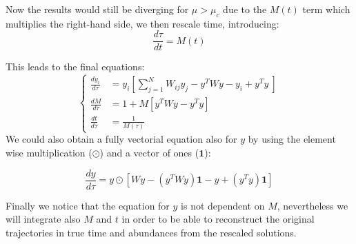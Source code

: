 Now the results would still be diverging for $\mu > \mu_c$ due to the $M(t)$ term which multiplies the right-hand side, we then rescale time, introducing:
\begin{equation}
    \frac{d\tau}{dt} = M(t)
\end{equation}

This leads to the final equations:
\begin{equation}
    \left\{
        \begin{aligned}
           \frac{dy_i}{d\tau} &= y_i \left[ \sum_{j=1}^N W_{ij} y_j - y^T W y  -  y_i + y^T y\ \right] \\
           \frac{dM}{d\tau} &= 1 + M \left[ y^T W y - y^T y \right] \\
           \frac{dt}{d\tau} &= \frac{1}{M(\tau)}
        \end{aligned}
    \right.
\end{equation}
We could also obtain a fully vectorial equation also for $y$ by using the element wise multiplication ($\odot$)  and a vector of ones ($\mathbf{1}$):

\begin{equation}
\frac{dy}{d\tau} = y \odot \left[ W y - (y^T W y)\mathbf{1} - y + (y^T y)\mathbf{1} \right]
\end{equation}

Finally we notice that the equation for $y$ is not dependent on $M$, nevertheless we will integrate also $M$ and $t$ in order to be able to reconstruct the original trajectories in true time and abundances from the rescaled solutions.
